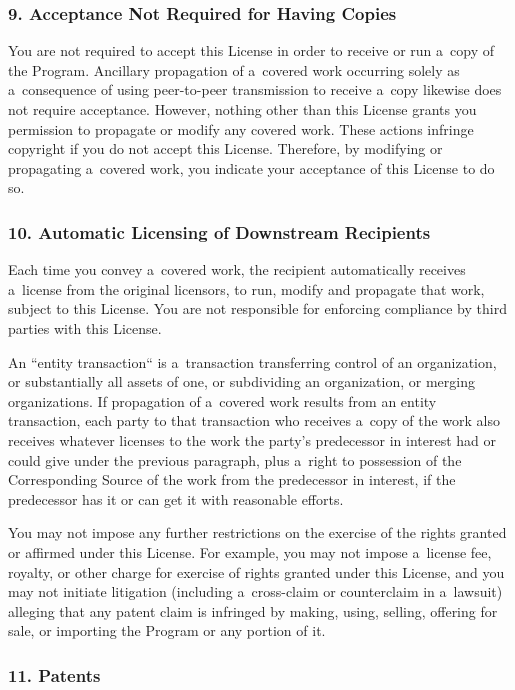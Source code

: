 \documentclass[a4paper, 11pt, twoside]{article}
\begin{document}
\subsubsection{9. Acceptance Not Required for Having Copies}

You are not required to accept this License in order to receive or run a~copy of the Program. Ancillary propagation of a~covered work occurring solely as a~consequence of using peer-to-peer transmission to receive a~copy likewise does not require acceptance. However, nothing other than this License grants you permission to propagate or modify any covered work. These actions infringe copyright if you do not accept this License. Therefore, by modifying or propagating a~covered work, you indicate your acceptance of this License to do so.

\subsubsection{10. Automatic Licensing of Downstream Recipients}

Each time you convey a~covered work, the recipient automatically receives a~license from the original licensors, to run, modify and propagate that work, subject to this License. You are not responsible for enforcing compliance by third parties with this License.

An “entity transaction“ is a~transaction transferring control of an organization, or substantially all assets of one, or subdividing an organization, or merging organizations. If propagation of a~covered work results from an entity transaction, each party to that transaction who receives a~copy of the work also receives whatever licenses to the work the party's predecessor in interest had or could give under the previous paragraph, plus a~right to possession of the Corresponding Source of the work from the predecessor in interest, if the predecessor has it or can get it with reasonable efforts.

You may not impose any further restrictions on the exercise of the rights granted or affirmed under this License. For example, you may not impose a~license fee, royalty, or other charge for exercise of rights granted under this License, and you may not initiate litigation (including a~cross-claim or counterclaim in a~lawsuit) alleging that any patent claim is infringed by making, using, selling, offering for sale, or importing the Program or any portion of it.

\subsubsection{11. Patents}
\end{document}
